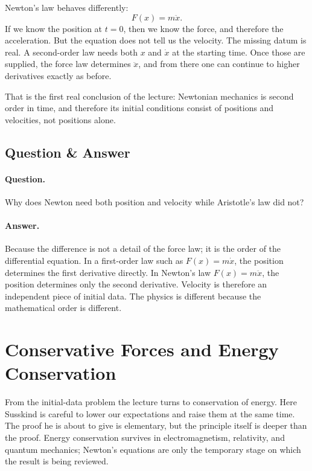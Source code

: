 Newton's law behaves differently:
\begin{equation}
F(x)=m\ddot x.
\end{equation}
If we know the position at \(t=0\), then we know the force, and therefore the acceleration. But the equation does not tell us the velocity. The missing datum is real. A second-order law needs both \(x\) and \(\dot x\) at the starting time. Once those are supplied, the force law determines \(\ddot x\), and from there one can continue to higher derivatives exactly as before.

That is the first real conclusion of the lecture: Newtonian mechanics is second order in time, and therefore its initial conditions consist of positions and velocities, not positions alone.

\subsection{Question \& Answer}

\paragraph{Question.} Why does Newton need both position and velocity while Aristotle's law did not?

\paragraph{Answer.} Because the difference is not a detail of the force law; it is the order of the differential equation. In a first-order law such as \(F(x)=m\dot x\), the position determines the first derivative directly. In Newton's law \(F(x)=m\ddot x\), the position determines only the second derivative. Velocity is therefore an independent piece of initial data. The physics is different because the mathematical order is different.

\section{Conservative Forces and Energy Conservation}

From the initial-data problem the lecture turns to conservation of energy. Here Susskind is careful to lower our expectations and raise them at the same time. The proof he is about to give is elementary, but the principle itself is deeper than the proof. Energy conservation survives in electromagnetism, relativity, and quantum mechanics; Newton's equations are only the temporary stage on which the result is being reviewed.

